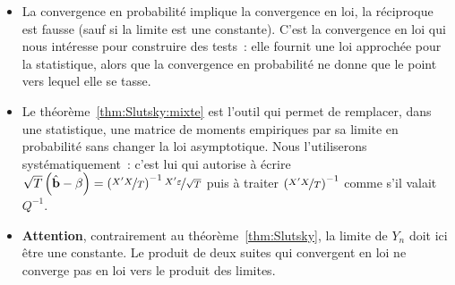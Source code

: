 \documentclass[10pt]{beamer}
\begin{document}
\begin{notes}

  \begin{itemize}

  \item La convergence en probabilité implique la convergence en loi, la
    réciproque est fausse (sauf si la limite est une constante). C'est la
    convergence en loi qui nous intéresse pour construire des tests~: elle
    fournit une loi approchée pour la statistique, alors que la convergence en
    probabilité ne donne que le point vers lequel elle se tasse.\newline

  \item Le théorème~\ref{thm:Slutsky:mixte} est l'outil qui permet de remplacer,
    dans une statistique, une matrice de moments empiriques par sa limite en
    probabilité sans changer la loi asymptotique. Nous l'utiliserons
    systématiquement~: c'est lui qui autorise à écrire
    $\sqrt{T}\left(\hat{\mathbf b}-\beta\right) = \left(\nicefrac{X'X}{T}\right)^{-1}\nicefrac{X'\varepsilon}{\sqrt T}$
    puis à traiter $\left(\nicefrac{X'X}{T}\right)^{-1}$ comme s'il valait
    $Q^{-1}$.\newline

  \item \textbf{Attention}, contrairement au théorème~\ref{thm:Slutsky}, la
    limite de $Y_n$ doit ici être une constante. Le produit de deux suites qui
    convergent en loi ne converge pas en loi vers le produit des limites.

  \end{itemize}

\end{notes}
\end{document}
